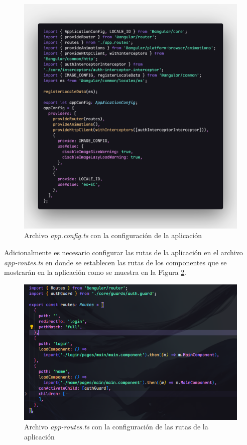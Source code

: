 \begin{figure}[H]
    \centering
    \includegraphics[width=1\textwidth]{resources/images/app-config}
    \caption{Archivo \textit{app.config.ts} con la configuración de la aplicación}
    \label{fig:app-config}
\end{figure}

Adicionalmente es necesario configurar las rutas de la aplicación en el archivo \textit{app-routes.ts} en donde se establecen las rutas de los componentes que se mostrarán en la aplicación como se muestra en la Figura \ref{fig:app-routing}.

\begin{figure}[H]
    \centering
    \includegraphics[width=1\textwidth]{resources/images/app-routes}
    \caption{Archivo \textit{app-routes.ts} con la configuración de las rutas de la aplicación}
    \label{fig:app-routing}
\end{figure}

